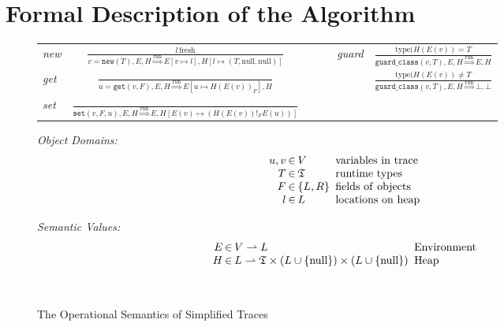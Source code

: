 \documentclass[preprint]{sigplanconf}
\begin{document}
\section{Formal Description of the Algorithm}
\label{sec:formal}


\begin{figure}
\begin{center}
\begin{tabular}{lcccc}
\emph{new} & ${\displaystyle \frac{l\,\mathrm{fresh}}{v=\mathtt{new}(T),E,H\overset{\mathrm{run}}{\Longrightarrow}E\left[v\mapsto l\right],H\left[l\mapsto\left(T,\mathrm{null},\mathrm{null}\right)\right]}}$ & ~~~ & \emph{guard} & ${\displaystyle \frac{\mathrm{type}(H(E(v))=T}{\mathtt{guard\_class}(v,T),E,H\overset{\mathrm{run}}{\Longrightarrow}E,H}}$\tabularnewline[3em]
\emph{get} & ${\displaystyle \frac{\,}{u=\mathtt{get}(v,F),E,H\overset{\mathrm{run}}{\Longrightarrow}E\left[u\mapsto H\left(E\left(v\right)\right)_{F}\right],H}}$ & ~~~ &  & ${\displaystyle \frac{\mathrm{type}(H(E(v))\neq T}{\mathtt{guard\_class}(v,T),E,H\overset{\mathrm{run}}{\Longrightarrow}\bot,\bot}}$\tabularnewline[3em]
\emph{set} & ${\displaystyle \frac{\,}{\mathtt{set}\left(v,F,u\right),E,H\overset{\mathrm{run}}{\Longrightarrow}E,H\left[E\left(v\right)\mapsto\left(H\left(E\left(v\right)\right)!_{F}E(u)\right)\right]}}$ & ~~~ &  & \tabularnewline[4em]
\end{tabular}

\begin{minipage}[b]{7 cm}
\emph{Object Domains:}
$$\setlength\arraycolsep{0.1em}
 \begin{array}{rcll}
    u,v & \in & V & \mathrm{\ variables\ in\ trace}\\
    T & \in & \mathfrak{T} & \mathrm{\ runtime\ types}\\
    F & \in & \left\{ L,R\right\} & \mathrm{\ fields\ of\ objects}\\
    l & \in & L & \mathrm{\ locations\ on\ heap}
 \end{array}
$$
\end{minipage}
\begin{minipage}[b]{5 cm}
\emph{Semantic Values:}
$$\setlength\arraycolsep{0.1em}
 \begin{array}{rcll}
    E & \in & V\rightharpoonup L & \mathrm{\ Environment}\\
    H & \in & L\rightharpoonup\mathfrak{T}\times(L\cup \{ \mathrm{null} \})\times (L\cup \{ \mathrm{null}\} ) & \mathrm{\ Heap}\\
    \\
    \\
 \end{array}
$$
\end{minipage}
\end{center}
\caption{The Operational Semantics of Simplified Traces}
\label{fig:semantics}
\end{figure}
\end{document}
